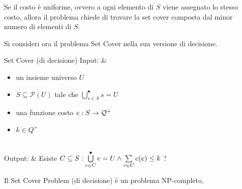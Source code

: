 Se il costo è uniforme, ovvero a ogni elemento di $S$ viene assegnato lo
stesso costo, allora il problema chiede di trovare la set cover composta dal
minor numero di elementi di $S$.

Si consideri ora il problema Set Cover nella sua versione di decisione.\\
\begin{problem}[lined]{Set Cover (di decisione)}
    Input: & \begin{minipage}[t]{0.8\linewidth}\begin{itemize}
        \setlength\itemsep{0em}
        \item un insieme universo $U$
        \item $S \subseteq \mathcal{P}(U)$ tale che
        $\bigcup\limits_{s \in S}^{\bullet} s = U$
        \item una funzione costo $\textnormal{c}: S \rightarrow \mathcal{Q}^+$
        \item $k \in Q^+$
    \end{itemize}\end{minipage}\\
    Output: & Esiste
    $C \subseteq S : \bigcup\limits_{e \in C}^{\bullet} e = U \land
    \sum\limits_{e \in C} \textnormal{c}(e) \le k$ ?
\end{problem}
\begin{thm}
    Il Set Cover Problem (di decisione) è un problema NP-completo.
\end{thm}

